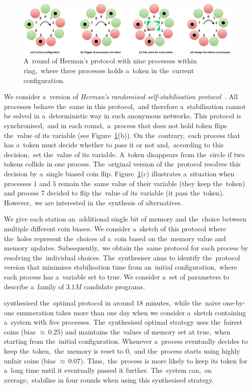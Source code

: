 \begin{figure}[h!]
\centering
\includegraphics[width=1.0\textwidth]{figures/herman_coins.pdf}
\caption{A~round of Herman's protocol with nine processes within ring,~where three processes holds a~token in the~current configuration.}%
\label{fig:herman}%
\end{figure}

We consider a~version of \textit{Herman's randomised self-stabilisation protocol}~\cite{herman1,herman2}.
All processes behave the~same in this protocol,~and therefore a~stabilisation cannot be solved in a~deterministic way in such anonymous networks.
This protocol is synchronised,~and in each round,~a~process that does not hold token flips the~value of its variable (see Figure~\ref{fig:herman}(b)).
On the~contrary,~each process that has a~token must decide whether to pass it or not and,~according to this decision,~set the~value of its variable.
A~token disappears from the~circle if two tokens collide in one process.
The~original version of the~protocol resolves this decision by a~single biased coin flip.
Figure~\ref{fig:herman}(c) illustrates a~situation when processes $1$ and $5$ remain the~same value of their variable (they keep the~token) and process $7$ decided to flip the~value of its variable (it pass the~token).
However,~we are interested in the~synthesis of alternatives.

We give each station an~additional single bit of memory and the~choice between multiple different coin biases.
We consider a~sketch of this protocol where the~holes represent the~choices of a~coin based on the~memory value and memory updates.
Subsequently,~we obtain the~same protocol for each process by resolving the~individual choices.
The~synthesiser aims to identify the~protocol version that minimises stabilisation time from an~initial configuration,~where each process has a~variable set to true.
We consider a~set of parameters to describe a~family of $3.1M$ candidate programs.

\toolname{} synthesised the~optimal protocol in around $18$ minutes,~while the~naive one-by-one enumeration takes more than one day when we consider a~sketch containing a~system with five processes.
The~synthesised optimal strategy uses the~fairest coins (bias ${\approx} \, 0.25$) and maintains the~values of memory set at true,~when starting from the~initial configuration.
Whenever a~process eventually decides to keep the~token,~the~memory is reset to $0$,~and the~process starts using highly unfair coins (bias ${\approx} \, 0.07$). 
Thus,~the~process is more likely to keep its token for a~long time until it eventually passed it further.
The~system can,~on average,~stabilise in four rounds when using this synthesised strategy.

